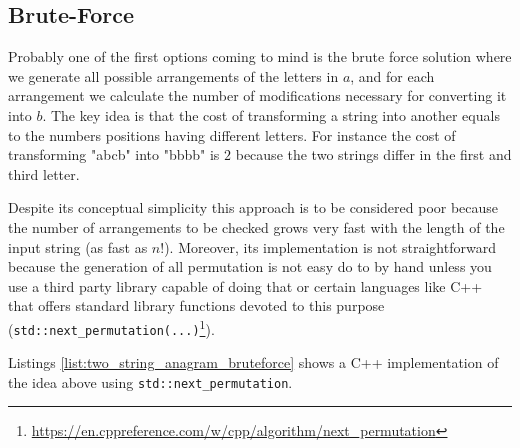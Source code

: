 \subsection{Brute-Force}
\label{sec:anagrams:bruteforce}
Probably one of the first options coming to mind is the brute force solution where we generate all possible arrangements of the letters in $a$, and
for each arrangement we calculate the number of modifications necessary for converting it into $b$. The key idea is that the cost of transforming a string into
another equals to the numbers positions having different letters. For instance the cost of transforming "abcb"
into "bbbb" is $2$ because the two strings differ in the first and third letter. 

Despite its conceptual simplicity this approach is to be considered poor because the number
of arrangements to be checked grows very fast with the length of the input string (as fast as $n!$).
Moreover, its implementation  is not straightforward because the generation of all permutation is not easy do to
by hand unless you use a third party library capable of doing that or certain languages like C++ that offers standard library functions devoted to this purpose (\lstinline[columns=fixed]{std::next_permutation(...)}\footnote{\url{https://en.cppreference.com/w/cpp/algorithm/next_permutation}}).

Listings \ref{list:two_string_anagram_bruteforce} shows a C++ implementation of the idea above using \lstinline[columns=fixed]{std::next_permutation}.



